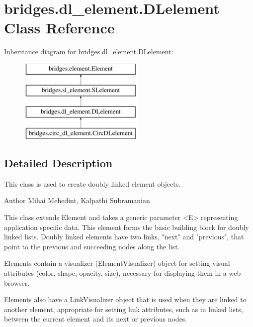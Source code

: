\hypertarget{classbridges_1_1dl__element_1_1_d_lelement}{}\section{bridges.\+dl\+\_\+element.\+D\+Lelement Class Reference}
\label{classbridges_1_1dl__element_1_1_d_lelement}
Inheritance diagram for bridges.\+dl\+\_\+element.\+D\+Lelement\+:\begin{figure}[H]
\begin{center}
\leavevmode
\includegraphics[height=4.000000cm]{classbridges_1_1dl__element_1_1_d_lelement}
\end{center}
\end{figure}


\subsection{Detailed Description}
This class is used to create doubly linked element objects. 

\begin{DoxyAuthor}{Author}
Mihai Mehedint, Kalpathi Subramanian
\end{DoxyAuthor}
\begin{DoxyVerb}This class extends Element and takes a generic parameter <E> representing
application specific data. This element forms the basic building block for
doubly linked lists. Doubly linked elements have two links,
"next" and "previous", that point to the previous and succeeding nodes along the list.

Elements contain a visualizer (ElementVisualizer) object for setting visual
attributes (color, shape, opacity, size), necessary for displaying them in a web
browser.

Elements also have a LinkVisualizer object that is used when they are linked to
another element, appropriate for setting link attributes, such as in linked lists,
between the current element and its next or previous nodes.
\end{DoxyVerb}


